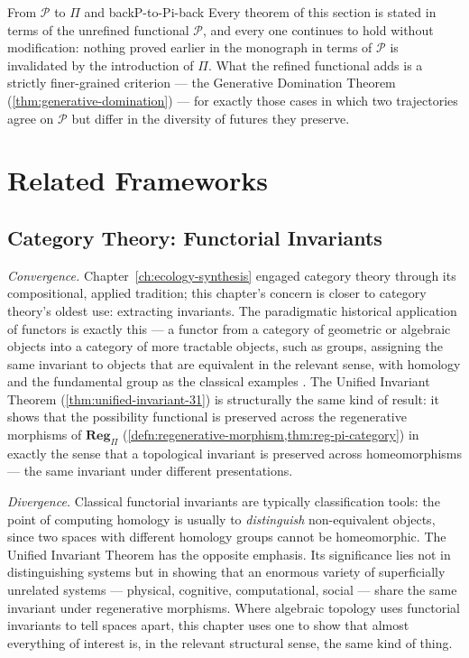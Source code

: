\documentclass[12pt,twoside,openright]{book}
\begin{document}
\begin{remark}{From $\mathcal{P}$ to $\Pi$ and back}{P-to-Pi-back}
  Every theorem of this section is stated in terms of the
  unrefined functional $\mathcal{P}$, and every one continues
  to hold without modification: nothing proved earlier in
  the monograph in terms of $\mathcal{P}$ is invalidated by
  the introduction of $\Pi$. What the refined functional adds
  is a strictly finer-grained criterion --- the Generative
  Domination Theorem (\cref{thm:generative-domination}) ---
  for exactly those cases in which two trajectories agree on
  $\mathcal{P}$ but differ in the diversity of futures they
  preserve.
\end{remark}

\section{Related Frameworks}
\label{sec:ch31-related-frameworks}

\subsection*{Category Theory: Functorial Invariants}

\emph{Convergence.} Chapter~\ref{ch:ecology-synthesis} engaged
category theory through its compositional, applied tradition;
this chapter's concern is closer to category theory's oldest use:
extracting invariants. The paradigmatic historical application of
functors is exactly this --- a functor from a category of
geometric or algebraic objects into a category of more tractable
objects, such as groups, assigning the same invariant to objects
that are equivalent in the relevant sense, with homology and the
fundamental group as the classical examples
\parencite{maclane1971,awodey2010}. The Unified Invariant Theorem
(\cref{thm:unified-invariant-31}) is structurally the same kind of
result: it shows that the possibility functional is preserved
across the regenerative morphisms of $\mathbf{Reg}_\Pi$
(\cref{defn:regenerative-morphism,thm:reg-pi-category}) in exactly
the sense that a topological invariant is preserved across
homeomorphisms --- the same invariant under different
presentations.

\emph{Divergence.} Classical functorial invariants are typically
classification tools: the point of computing homology is usually
to \emph{distinguish} non-equivalent objects, since two spaces
with different homology groups cannot be homeomorphic. The Unified
Invariant Theorem has the opposite emphasis. Its significance lies
not in distinguishing systems but in showing that an enormous
variety of superficially unrelated systems --- physical,
cognitive, computational, social --- share the same invariant
under regenerative morphisms. Where algebraic topology uses
functorial invariants to tell spaces apart, this chapter uses one
to show that almost everything of interest is, in the relevant
structural sense, the same kind of thing.
\end{document}
